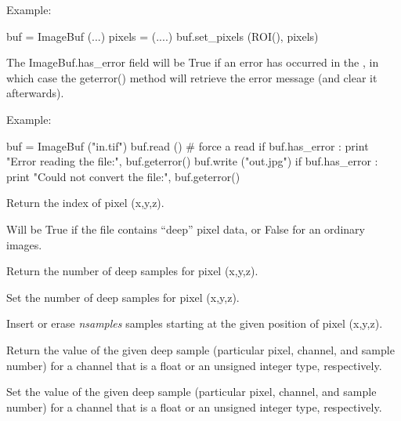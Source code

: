 \noindent Example:
\begin{code}
    buf = ImageBuf (...)
    pixels = (....)
    buf.set_pixels (ROI(), pixels)
\end{code}
\apiend

The {\cf ImageBuf.has_error} field will be {\cf True} if an error has
occurred in the \ImageBuf, in which case the {\cf geterror()} method will
retrieve the error message (and clear it afterwards).

\noindent Example:
\begin{code}
    buf = ImageBuf ("in.tif")
    buf.read ()   # force a read
    if buf.has_error :
        print "Error reading the file:", buf.geterror()
    buf.write ("out.jpg")
    if buf.has_error :
        print "Could not convert the file:", buf.geterror()
\end{code}
\apiend

Return the index of pixel (x,y,z).
\apiend

Will be {\cf True} if the file contains ``deep'' pixel data, or {\cf False}
for an ordinary images.
\apiend

Return the number of deep samples for pixel (x,y,z).
\apiend

Set the number of deep samples for pixel (x,y,z).
\apiend

Insert or erase \emph{nsamples} samples starting at the given position of
pixel {\cf (x,y,z)}.
\apiend

Return the value of the given deep sample (particular pixel, channel, and
sample number) for a channel that is a float or an unsigned integer type,
respectively.
\apiend

Set the value of the given deep sample (particular pixel, channel, and
sample number) for a channel that is a float or an unsigned integer type,
respectively.
\apiend

